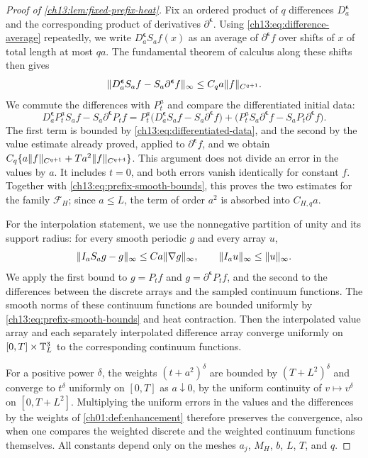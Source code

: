 \begin{proof}[Proof of \cref{ch13:lem:fixed-prefix-heat}]
Fix an ordered product of $q$ differences $D_a^{\boldsymbol\epsilon}$ and the corresponding product of derivatives $\partial^{\boldsymbol\epsilon}$. Using \eqref{ch13:eq:difference-average} repeatedly, we write $D_a^{\boldsymbol\epsilon}S_af(x)$ as an average of $\partial^{\boldsymbol\epsilon}f$ over shifts of $x$ of total length at most $qa$. The fundamental theorem of calculus along these shifts then gives
\begin{equation}\label{ch13:eq:differentiated-data}
 \lVert D_a^{\boldsymbol\epsilon}S_af-S_a\partial^{\boldsymbol\epsilon}f\rVert_\infty\le C_qa\lVert f\rVert_{C^{q+1}}.
\end{equation}
We commute the differences with $P_t^a$ and compare the differentiated initial data:
\[
 D_a^{\boldsymbol\epsilon}P_t^aS_af-S_a\partial^{\boldsymbol\epsilon}P_tf
 =P_t^a\bigl(D_a^{\boldsymbol\epsilon}S_af-S_a\partial^{\boldsymbol\epsilon}f\bigr)
 +\bigl(P_t^aS_a\partial^{\boldsymbol\epsilon}f-S_aP_t\partial^{\boldsymbol\epsilon}f\bigr).
\]
The first term is bounded by \eqref{ch13:eq:differentiated-data}, and the second by the value estimate already proved, applied to $\partial^{\boldsymbol\epsilon}f$, and we obtain $C_q\{a\lVert f\rVert_{C^{q+1}}+Ta^2\lVert f\rVert_{C^{q+4}}\}$. This argument does not divide an error in the values by $a$. It includes $t=0$, and both errors vanish identically for constant $f$. Together with \eqref{ch13:eq:prefix-smooth-bounds}, this proves the two estimates for the family $\mathscr F_H$; since $a\le L$, the term of order $a^2$ is absorbed into $C_{H,q}a$.

For the interpolation statement, we use the nonnegative partition of unity and its support radius: for every smooth periodic $g$ and every array $u$,
\begin{equation}\label{ch13:eq:sampling-interpolation}
 \lVert I_aS_ag-g\rVert_\infty\le Ca\lVert \nabla g\rVert_\infty,\qquad\lVert I_au\rVert_\infty\le\lVert u\rVert_\infty.
\end{equation}
We apply the first bound to $g=P_tf$ and $g=\partial^{\boldsymbol\epsilon}P_tf$, and the second to the differences between the discrete arrays and the sampled continuum functions. The smooth norms of these continuum functions are bounded uniformly by \eqref{ch13:eq:prefix-smooth-bounds} and heat contraction. Then the interpolated value array and each separately interpolated difference array converge uniformly on $[0,T]\times\mathbb T_L^3$ to the corresponding continuum functions.

For a positive power $\delta$, the weights $(t+a^2)^\delta$ are bounded by $(T+L^2)^\delta$ and converge to $t^\delta$ uniformly on $[0,T]$ as $a\downarrow0$, by the uniform continuity of $v\mapsto v^\delta$ on $[0,T+L^2]$. Multiplying the uniform errors in the values and the differences by the weights of \cref{ch01:def:enhancement} therefore preserves the convergence, also when one compares the weighted discrete and the weighted continuum functions themselves. All constants depend only on the meshes $a_j$, $M_H$, $b$, $L$, $T$, and $q$.
\end{proof}
